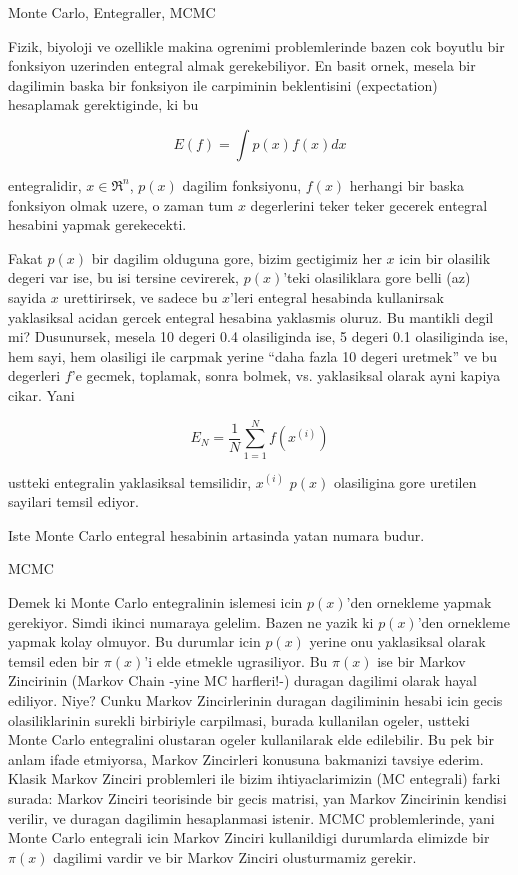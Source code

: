 \documentclass[12pt,fleqn]{article}
\begin{document}
Monte Carlo, Entegraller, MCMC

Fizik, biyoloji ve ozellikle makina ogrenimi problemlerinde bazen cok
boyutlu bir fonksiyon uzerinden entegral almak gerekebiliyor. En basit
ornek, mesela bir dagilimin baska bir fonksiyon ile carpiminin beklentisini
(expectation) hesaplamak gerektiginde, ki bu

\[ E(f) = \int p(x)f(x)dx \]

entegralidir, $x \in \Re^n$, $p(x)$ dagilim fonksiyonu, $f(x)$ herhangi bir
baska fonksiyon olmak uzere, o zaman tum $x$ degerlerini teker teker
gecerek entegral hesabini yapmak gerekecekti.

Fakat $p(x)$ bir dagilim olduguna gore, bizim gectigimiz her $x$ icin bir
olasilik degeri var ise, bu isi tersine cevirerek, $p(x)$'teki olasiliklara
gore belli (az) sayida $x$ urettirirsek, ve sadece bu $x$'leri entegral
hesabinda kullanirsak yaklasiksal acidan gercek entegral hesabina yaklasmis
oluruz. Bu mantikli degil mi? Dusunursek, mesela 10 degeri 0.4 olasiliginda
ise, 5 degeri 0.1 olasiliginda ise, hem sayi, hem olasiligi ile carpmak
yerine ``daha fazla 10 degeri uretmek'' ve bu degerleri $f$'e gecmek,
toplamak, sonra bolmek, vs. yaklasiksal olarak ayni kapiya cikar. Yani

\[ E_N = \frac{1}{N}\sum_{1=1}^N f(x^{(i)}) \]

ustteki entegralin yaklasiksal temsilidir, $x^{(i)}$ $p(x)$ olasiligina
gore uretilen sayilari temsil ediyor. 

Iste Monte Carlo entegral hesabinin artasinda yatan numara budur. 

MCMC

Demek ki Monte Carlo entegralinin islemesi icin $p(x)$'den ornekleme yapmak
gerekiyor. Simdi ikinci numaraya gelelim. Bazen ne yazik ki $p(x)$'den
ornekleme yapmak kolay olmuyor. Bu durumlar icin $p(x)$ yerine onu
yaklasiksal olarak temsil eden bir $\pi(x)$'i elde etmekle ugrasiliyor. Bu
$\pi(x)$ ise bir Markov Zincirinin (Markov Chain -yine MC harfleri!-)
duragan dagilimi olarak hayal ediliyor. Niye? Cunku Markov Zincirlerinin
duragan dagiliminin hesabi icin gecis olasiliklarinin surekli birbiriyle
carpilmasi, burada kullanilan ogeler, ustteki Monte Carlo entegralini
olustaran ogeler kullanilarak elde edilebilir. Bu pek bir anlam ifade
etmiyorsa, Markov Zincirleri konusuna bakmanizi tavsiye ederim. Klasik
Markov Zinciri problemleri ile bizim ihtiyaclarimizin (MC entegrali) farki
surada: Markov Zinciri teorisinde bir gecis matrisi, yan Markov Zincirinin
kendisi verilir, ve duragan dagilimin hesaplanmasi istenir. MCMC
problemlerinde, yani Monte Carlo entegrali icin Markov Zinciri kullanildigi
durumlarda elimizde bir $\pi(x)$ dagilimi vardir ve bir Markov Zinciri
olusturmamiz gerekir.
\end{document}
